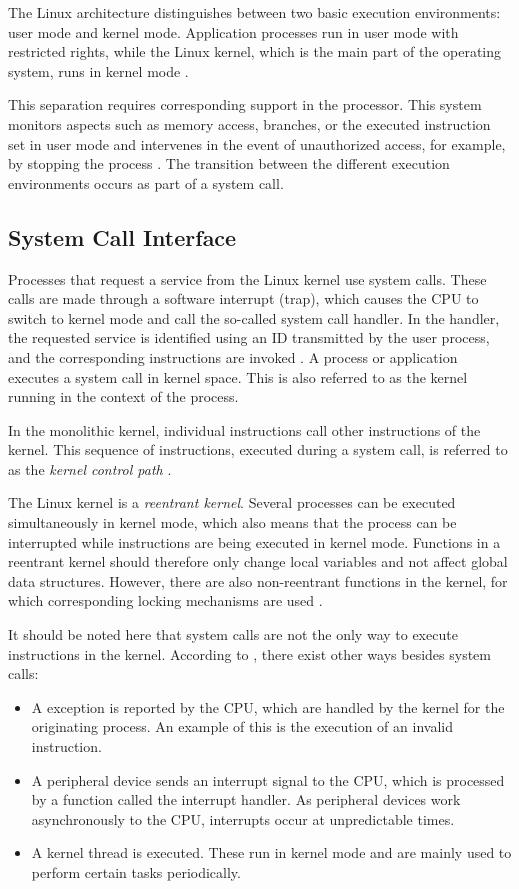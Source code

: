 The Linux architecture distinguishes between two basic execution environments: user mode and kernel mode. Application processes run in user mode with restricted rights, while the Linux kernel, which is the main part of the operating system, runs in kernel mode \cite{like02}.

This separation requires corresponding support in the processor. This system monitors aspects such as memory access, branches, or the executed instruction set in user mode and intervenes in the event of unauthorized access, for example, by stopping the process \cite{like06}. The transition between the different execution environments occurs as part of a system call.


\subsection{System Call Interface}

Processes that request a service from the Linux kernel use system calls. These calls are made through a software interrupt (trap), which causes the CPU to switch to kernel mode and call the so-called system call handler. In the handler, the requested service is identified using an ID transmitted by the user process, and the corresponding instructions are invoked \cite{like02}. A process or application executes a system call in kernel space. This is also referred to as the kernel running in the context of the process.

In the monolithic kernel, individual instructions call other instructions of the kernel.  This sequence of instructions, executed during a system call, is referred to as the \textit{kernel control path} \cite{like07}.

The Linux kernel is a \textit{reentrant kernel}. Several processes can be executed simultaneously in kernel mode, which also means that the process can be interrupted while instructions are being executed in kernel mode. Functions in a reentrant kernel should therefore only change local variables and not affect global data structures. However, there are also non-reentrant functions in the kernel, for which corresponding locking mechanisms are used \cite{like02}.

It should be noted here that system calls are not the only way to execute instructions in the kernel. According to \cite{like02}, there exist other ways besides system calls:

\begin{itemize}
\item A exception is reported by the CPU, which are handled by the kernel for the originating process. An example of this is the execution of an invalid instruction.
\item A peripheral device sends an interrupt signal to the CPU, which is processed by a function called the interrupt handler. As peripheral devices work asynchronously to the CPU, interrupts occur at unpredictable times.
\item A kernel thread is executed. These run in kernel mode and are mainly used to perform certain tasks periodically.
\end{itemize}


